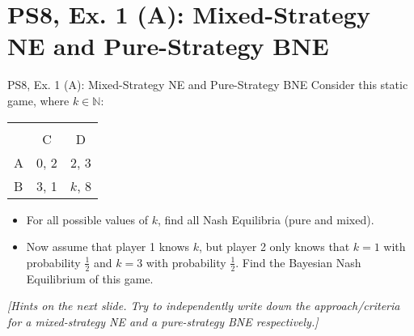 \section{PS8, Ex. 1 (A): Mixed-Strategy NE and Pure-Strategy BNE}

\begin{frame}{PS8, Ex. 1 (A): Mixed-Strategy NE and Pure-Strategy BNE}
    Consider this static game, where $k\in\mathbb{N}:$
    \vspace{-8pt}
    \begin{table}
      \begin{tabular}{l|c|c|}
        \multicolumn{1}{c}{} & \multicolumn{2}{c}{} \\
        \multicolumn{1}{c}{} & \multicolumn{1}{c}{C} & \multicolumn{1}{c}{D} \\\cline{2-3}
        A & 0, 2 & 2, 3 \\\cline{2-3}
        B & 3, 1 & $k$, 8 \\\cline{2-3}
      \end{tabular}
    \end{table}
    \begin{itemize}
      \item[(a)] For all possible values of $k$, find all Nash Equilibria (pure and mixed).
      \item[(b)] Now assume that player 1 knows $k$, but player 2 only knows that $k = 1$ with probability $\frac{1}{2}$ and $k = 3$ with probability $\frac{1}{2}$. Find the Bayesian Nash Equilibrium of this game.
    \end{itemize}
    \textit{[Hints on the next slide. Try to independently write down the approach/criteria for a mixed-strategy NE and a pure-strategy BNE respectively.]}
    \vfill\null
\end{frame}
